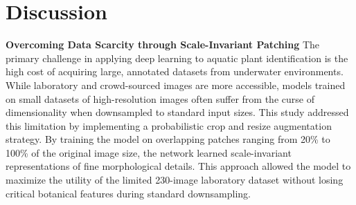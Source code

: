 \documentclass[final,3p,times,twocolumn]{elsarticle}
\begin{document}



\section{Discussion}

\textbf{Overcoming Data Scarcity through Scale-Invariant Patching}
The primary challenge in applying deep learning to aquatic plant identification is the high cost of acquiring large, annotated datasets from underwater environments. While laboratory and crowd-sourced images are more accessible, models trained on small datasets of high-resolution images often suffer from the curse of dimensionality when downsampled to standard input sizes. This study addressed this limitation by implementing a probabilistic crop and resize augmentation strategy. By training the model on overlapping patches ranging from 20\% to 100\% of the original image size, the network learned scale-invariant representations of fine morphological details. This approach allowed the model to maximize the utility of the limited 230-image laboratory dataset without losing critical botanical features during standard downsampling.
\end{document}
